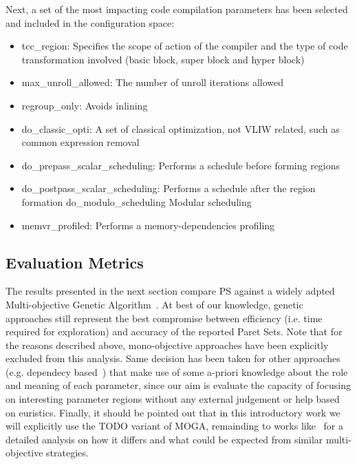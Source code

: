\begin{itemize}
Next, a set of the most impacting code compilation parameters has been
selected and included in the configuration space:
\begin{itemize}
\item{tcc\_region}: Specifies the scope of action of the compiler and the type
of code transformation involved (basic block, super block and hyper
block) 
\item {max\_unroll\_allowed}: The number of unroll iterations allowed
\item{regroup\_only}: Avoids inlining 
\item{do\_classic\_opti}: A set of classical optimization, not VLIW related,
such as common expression removal 
\item{do\_prepass\_scalar\_scheduling}: Performs a schedule before
forming regions 
\item{do\_postpass\_scalar\_scheduling}: Performs a schedule after the region formation 
do\_modulo\_scheduling  Modular scheduling 
\item{memvr\_profiled}: Performs a memory-dependencies profiling 
\end{itemize}

\subsection{Evaluation Metrics}

The results presented in the next section compare PS against a widely
adpted Multi-objective Genetic Algorithm~\cite{}. At best of our
knowledge, genetic approaches
still represent the best compromise between efficiency (i.e. time
required for exploration) and accuracy of the reported Paret Sets.
Note that for the reasons described above, mono-objective approaches have been
explicitly excluded from this analysis. Same decision has been taken
for other approaches (e.g. dependecy based~\cite{dep}) that make use of some a-priori knowledge about the
role and meaning of each parameter, since our
aim is evaluate the capacity of focusing on interesting
parameter regions without any external judgement or help based on
euristics.  Finally, it should be pointed
out that in this introductory work we will explicitly use the TODO
variant of MOGA, remainding to works like~\cite{} for a detailed
analysis on how it differs and what could be expected from similar multi-objective strategies.


\end{itemize}
